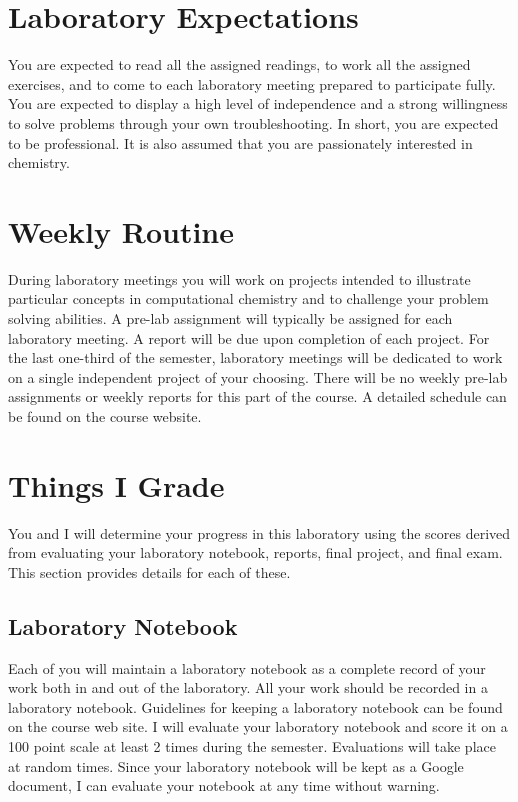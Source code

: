 \documentclass[letterpaper,oneside,onecolumn,11pt,article]{memoir}
\begin{document}
\section{Laboratory Expectations}
You are expected to read all the assigned readings, to work all the assigned exercises, and to come to each laboratory meeting prepared to participate fully. You are expected to display a high level of independence and a strong willingness to solve problems through your own troubleshooting. In short, you are expected to be professional. It is also assumed that you are passionately interested in chemistry.

\section{Weekly Routine}
During laboratory meetings you will work on projects intended to illustrate particular concepts in computational chemistry and to challenge your problem solving abilities. A pre-lab assignment will typically be assigned for each laboratory meeting. A report will be due upon completion of each project. For the last one-third of the semester, laboratory meetings will be dedicated to work on a single independent project of your choosing. There will be no weekly pre-lab assignments or weekly reports for this part of the course. A detailed schedule can be found on the course website.

\section{Things I Grade}
You and I will determine your progress in this laboratory using the scores derived from evaluating your laboratory notebook, reports, final project, and final exam. This section provides details for each of these.

\subsection{Laboratory Notebook}
Each of you will maintain a laboratory notebook as a complete record of your work both in and out of the laboratory. All your work should be recorded in a laboratory notebook. Guidelines for keeping a laboratory notebook can be found on the course web site. I will evaluate your laboratory notebook and score it on a 100 point scale at least 2 times during the semester. Evaluations will take place at random times. Since your laboratory notebook will be kept as a Google document, I can evaluate your notebook at any time without warning.
\end{document}
